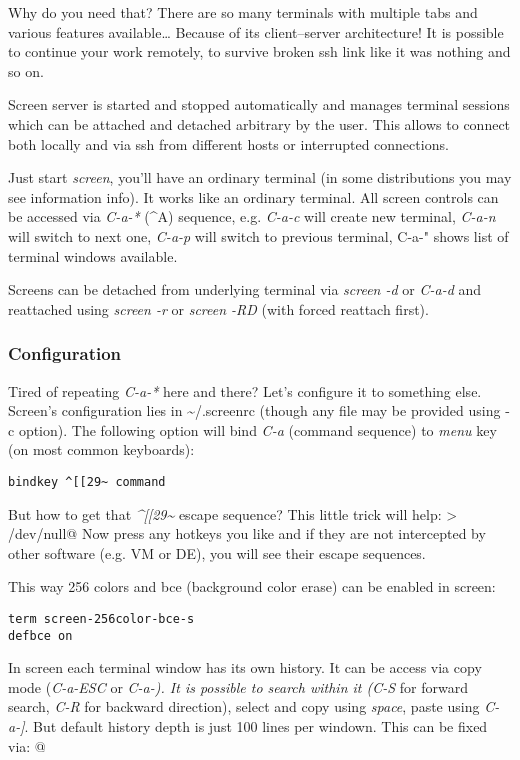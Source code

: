 \documentclass[10pt, a5paper]{article}
\begin{document}
Why do you need that? There are so many terminals with multiple tabs and various features available\ldots{} Because of its client–server \linebreak architecture! It is possible to continue your work remotely, to survive broken ssh link like it was nothing and so on.

Screen server is started and stopped automatically and manages terminal sessions which can be attached and detached arbitrary by the user. This allows to connect both locally and via ssh from different hosts or interrupted connections.

Just start \emph{screen}, you'll have an ordinary terminal (in some \linebreak distributions you may see information info). It works like an ordinary terminal. All screen controls can be accessed via \emph{C-a-*} (\^{}A) sequence, e.g. \emph{C-a-c} will create new terminal, \emph{C-a-n} will switch to next one, \emph{C-a-p} will switch to previous terminal, C-a-" shows list of terminal windows available.

Screens can be detached from underlying terminal via \emph{screen -d} or \emph{C-a-d} and reattached using \emph{screen -r} or \emph{screen -RD} (with forced reattach first).

\subsubsection*{Configuration}

Tired of repeating \emph{C-a-*} here and there? Let's configure it to \linebreak something else. Screen's configuration lies in \~{}/.screenrc (though any file may be provided using -c option). The following option will bind \emph{C-a} (command sequence) to \emph{menu} key (on most common keyboards):

\begin{verbatim}
bindkey ^[[29~ command\end{verbatim}
But how to get that \emph{\^{}[[29\~{}} escape sequence? This little trick will help:
\verb@cat > /dev/null@
Now press any hotkeys you like and if they are not intercepted by other software (e.g. VM or DE), you will see their escape sequences.

This way 256 colors and bce (background color erase) can be enabled in screen:

\begin{verbatim}
term screen-256color-bce-s
defbce on\end{verbatim}
In screen each terminal window has its own history. It can be access via copy mode (\emph{C-a-ESC} or \emph{C-a-\emph{). It is possible to search within it (}C-S} for forward search, \emph{C-R} for backward direction), select and copy using \emph{space}, paste using \emph{C-a-]}. But default history depth is just 100 lines per windown. This can be fixed via:
@
\end{document}
